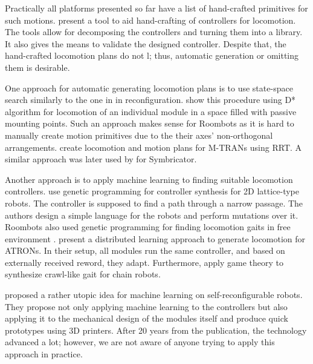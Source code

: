 Practically all platforms presented so far have a list of hand-crafted
primitives for such motions. \textcite{DBLP:conf/isrr/TosunJKY15} present a tool
to aid hand-crafting of controllers for locomotion. The tools allow for
decomposing the controllers and turning them into a library. It also gives the
means to validate the designed controller. Despite that, the hand-crafted
locomotion plans do not l; thus, automatic generation or
omitting them is desirable.

One approach for automatic generating locomotion plans is to use state-space
search similarly to the one in in reconfiguration.
\textcite{DBLP:conf/robotik/BonardiMSVI12} show this procedure using D*
algorithm for locomotion of an individual module in a space filled with passive
mounting points. Such an approach makes sense for Roombots as it is hard to
manually create motion primitives due to the their axes' non-orthogonal
arrangements. \textcite{DBLP:conf/dars/YoshidaKKMTK04} create locomotion and
motion plans for M-TRANs using RRT. A similar approach was later used by
\textcite{DBLP:conf/taros/VonasekKP12} for Symbricator.

Another approach is to apply machine learning to finding suitable locomotion
controllers. \textcite{DBLP:conf/eh/BennettR00} use genetic programming for
controller synthesis for 2D lattice-type robots. The controller is supposed to
find a path through a narrow passage. The authors design a simple language for
the robots and perform mutations over it. Roombots also used genetic programming
for finding locomotion gaits in free environment \cite{aydn_2010,
DBLP:journals/procedia/PouyaAMI11}. \textcite{DBLP:journals/ras/ChristensenSS13}
present a distributed learning approach to generate locomotion for ATRONs. In
their setup, all modules run the same controller, and based on externally
received reword, they adapt. Furthermore, \textcite{DBLP:conf/iros/DuttaDN17}
apply game theory to synthesize crawl-like gait for chain robots.

\textcite{DBLP:conf/icra/LipsonP00} proposed a rather utopic idea for machine
learning on self-reconfigurable robots. They propose not only applying machine
learning to the controllers but also applying it to the mechanical design of
the modules itself and produce quick prototypes using 3D printers. After 20
years from the publication, the technology advanced a lot; however, we are not
aware of anyone trying to apply this approach in practice.

